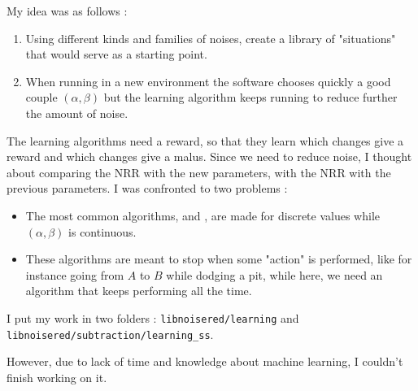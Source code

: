 My idea was as follows : 
\begin{enumerate}
\item Using different kinds and families of noises, create a library of "situations" that would serve as a starting point.
\item When running in a new environment the software chooses quickly a good couple $(\alpha, \beta)$ but the learning algorithm keeps running to reduce further the amount of noise.
\end{enumerate}

The learning algorithms need a reward, so that they learn which changes give a reward and which changes give a malus.
Since we need to reduce noise, I thought about comparing the \ac{NRR} with the new parameters, with the \ac{NRR} with the previous parameters.
I was confronted to two problems : 
\begin{itemize}
\item The most common algorithms, \cite{watkins1992q} and \cite{rummery1994line}, are made for discrete values while  $(\alpha, \beta)$ is continuous.
\item These algorithms are meant to stop when some "action" is performed, like for instance going from $A$ to $B$ while dodging a pit, while here, we need an algorithm that keeps performing all the time.
\end{itemize}

I put my work in two folders : \texttt{libnoisered/learning} and \texttt{libnoisered/subtraction/learning\_ss}.

However, due to lack of time and knowledge about machine learning, I couldn't finish working on it.
